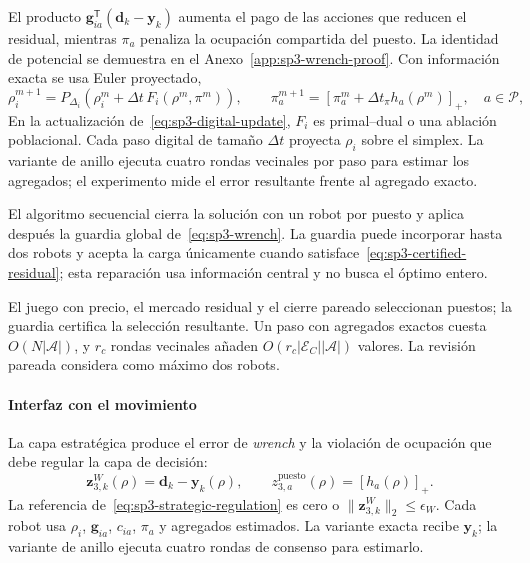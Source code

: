 El producto $\boldsymbol g_{ia}^{\mathsf T}(\boldsymbol d_k-\boldsymbol y_k)$ aumenta el pago de las acciones que reducen el residual, mientras $\pi_a$ penaliza la ocupación compartida del puesto. La identidad de potencial se demuestra en el Anexo~\ref{app:sp3-wrench-proof}. Con información exacta se usa Euler proyectado,
\begin{equation}
\label{eq:sp3-digital-update}
  \rho_i^{m+1}=P_{\Delta_i}\!\left(\rho_i^m+\Delta t\,F_i(\rho^m,\pi^m)\right),
  \qquad
  \pi_a^{m+1}=\left[\pi_a^m+\Delta t_\pi h_a(\rho^m)\right]_+,
  \quad a\in\mathcal P,
\end{equation}
En la actualización de~\eqref{eq:sp3-digital-update}, $F_i$ es primal--dual o una ablación poblacional. Cada paso digital de tamaño $\Delta t$ proyecta $\rho_i$ sobre el simplex. La variante de anillo ejecuta cuatro rondas vecinales por paso para estimar los agregados; el experimento mide el error resultante frente al agregado exacto.

El algoritmo secuencial cierra la solución con un robot por puesto y aplica después la guardia global de~\eqref{eq:sp3-wrench}. La guardia puede incorporar hasta dos robots y acepta la carga únicamente cuando satisface~\eqref{eq:sp3-certified-residual}; esta reparación usa información central y no busca el óptimo entero.

El juego con precio, el mercado residual y el cierre pareado seleccionan puestos; la guardia certifica la selección resultante. Un paso con agregados exactos cuesta $O(N|\mathcal A|)$, y $r_c$ rondas vecinales añaden $O(r_c|\mathcal E_C||\mathcal A|)$ valores. La revisión pareada considera como máximo dos robots.

\paragraph{Interfaz con el movimiento}

La capa estratégica produce el error de \emph{wrench} y la violación de ocupación que debe regular la capa de decisión:
\begin{equation}
 \boldsymbol z_{3,k}^{W}(\rho)
 =\boldsymbol d_k-\boldsymbol y_k(\rho),
 \qquad
 z_{3,a}^{\mathrm{puesto}}(\rho)=[h_a(\rho)]_+.
 \label{eq:sp3-strategic-regulation}
\end{equation}
La referencia de~\eqref{eq:sp3-strategic-regulation} es cero o $\|\boldsymbol z_{3,k}^{W}\|_2\leq\epsilon_W$. Cada robot usa $\rho_i$, $\boldsymbol g_{ia}$, $c_{ia}$, $\pi_a$ y agregados estimados. La variante exacta recibe $\boldsymbol y_k$; la variante de anillo ejecuta cuatro rondas de consenso para estimarlo.


